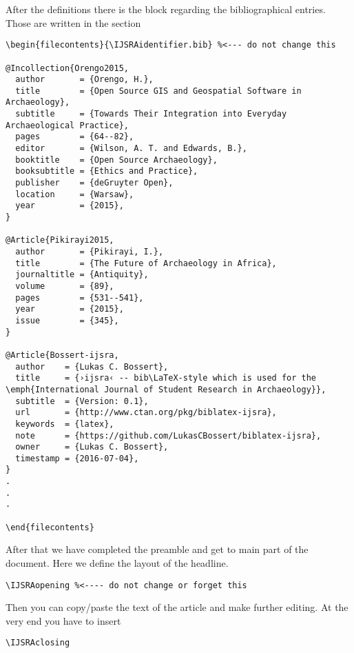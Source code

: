 \documentclass[
	]{ijsra}
\def\IJSRAidentifier{\currfilebase}
\begin{document}
\IJSRAseparator
After the definitions there is the block regarding the bibliographical entries.
Those are written in the section 
\begin{lstlisting}[label=bibliography,caption={Bibliographical information}]
\begin{filecontents}{\IJSRAidentifier.bib} %<--- do not change this

@Incollection{Orengo2015,
  author       = {Orengo, H.},
  title        = {Open Source GIS and Geospatial Software in Archaeology},
  subtitle     = {Towards Their Integration into Everyday Archaeological Practice},
  pages        = {64--82},
  editor       = {Wilson, A. T. and Edwards, B.},
  booktitle    = {Open Source Archaeology},
  booksubtitle = {Ethics and Practice},
  publisher    = {deGruyter Open},
  location     = {Warsaw},
  year         = {2015},
}

@Article{Pikirayi2015,
  author       = {Pikirayi, I.},
  title        = {The Future of Archaeology in Africa},
  journaltitle = {Antiquity},
  volume       = {89},
  pages        = {531--541},
  year         = {2015},
  issue        = {345},
}

@Article{Bossert-ijsra,
  author    = {Lukas C. Bossert},
  title     = {›ijsra‹ -- bib\LaTeX-style which is used for the \emph{International Journal of Student Research in Archaeology}},
  subtitle  = {Version: 0.1},
  url       = {http://www.ctan.org/pkg/biblatex-ijsra},
  keywords  = {latex},
  note      = {https://github.com/LukasCBossert/biblatex-ijsra},
  owner     = {Lukas C. Bossert},
  timestamp = {2016-07-04},
}
.
.
.

\end{filecontents}
\end{lstlisting}

After that we have completed the preamble and get to main part of the document.
Here we define the layout of the headline.

\begin{lstlisting}[label=headline,caption={Headline layout}]
\IJSRAopening %<---- do not change or forget this
\end{lstlisting}

\IJSRAseparator
Then you can copy/paste the text of the article and make further editing.
At the very end you have to insert 
\begin{lstlisting}[label=closing,caption={IJSRAclosing}]
\IJSRAclosing
\end{lstlisting}
\end{document}

